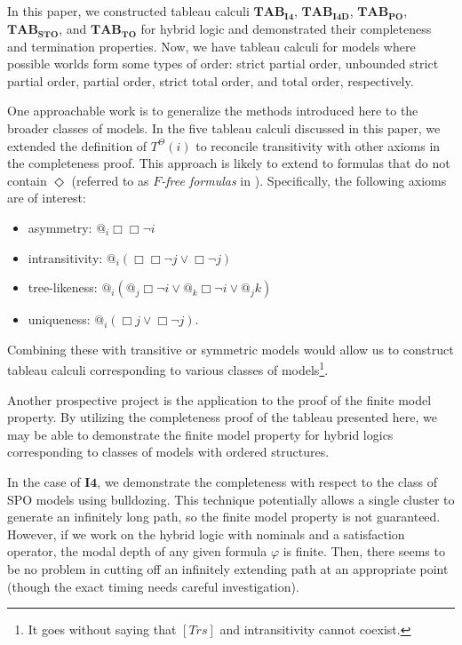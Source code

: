 \documentclass{article}
\theoremstyle{definition}
\newcommand{\Dia}{\Diamond}
\newcommand{\trans}{\mathit{Trs}}
\newcommand{\tableauIF}{\mathbf{TAB}_{\mathbf{I4}}}
\newcommand{\tableauIFD}{\mathbf{TAB}_{\mathbf{I4D}}}
\newcommand{\tableauPO}{\mathbf{TAB}_{\textbf{PO}}}
\newcommand{\tableauIFT}{\mathbf{TAB}_{\textbf{STO}}}
\newcommand{\tableauTO}{\mathbf{TAB}_{\textbf{TO}}}
\begin{document}
In this paper, we constructed tableau calculi $\tableauIF$, $\tableauIFD$, $ \tableauPO$, $\tableauIFT$, and $\tableauTO$ for hybrid logic and demonstrated their completeness and termination properties. Now, we have tableau calculi for models where possible worlds form some types of order: strict partial order, unbounded strict partial order, partial order, strict total order, and total order, respectively.

One approachable work is to generalize the methods introduced here to the broader classes of models. In the five tableau calculi discussed in this paper, we extended the definition of $T^\Theta(i)$ to reconcile transitivity with other axioms in the completeness proof. This approach is likely to extend to formulas that do not contain $\Dia$ (referred to as \emph{$F$-free formulas} in \cite{bolander2009}). Specifically, the following axioms are of interest:
\begin{itemize}
    \item asymmetry: $@_i \Box \Box \neg i$
    \item intransitivity: $@_i (\Box \Box \neg j \lor \Box \neg j)$
    \item tree-likeness: $@_i (@_j \Box \neg i \lor @_k \Box \neg i \lor @_j k)$
    \item uniqueness: $@_i (\Box j \lor \Box \neg j)$.
\end{itemize}
Combining these with transitive or symmetric models would allow us to construct tableau calculi corresponding to various classes of models\footnote{It goes without saying that $[\trans]$ and intransitivity cannot coexist.}.

Another prospective project is the application to the proof of the finite model property.
By utilizing the completeness proof of the tableau presented here, we may be able to demonstrate the finite model property for hybrid logics corresponding to classes of models with ordered structures.

In the case of $\mathbf{I4}$, we demonstrate the completeness with respect to the class of SPO models using bulldozing.
This technique potentially allows a single cluster to generate an infinitely long path, so the finite model property is not guaranteed.
However, if we work on the hybrid logic with nominals and a satisfaction operator, the modal depth of any given formula $\varphi$ is finite.
Then, there seems to be no problem in cutting off an infinitely extending path at an appropriate point (though the exact timing needs careful investigation).
\end{document}
